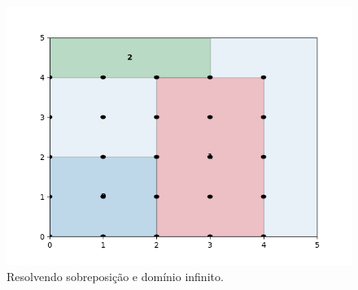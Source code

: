 \begin{figure}[!htb]
    \centering
    \includegraphics[scale=0.5]{utils/images/discrete_example2}
    \caption{Resolvendo sobreposição e domínio infinito.}
    \label{fig:sobreposicao-dominio5}
\end{figure}
